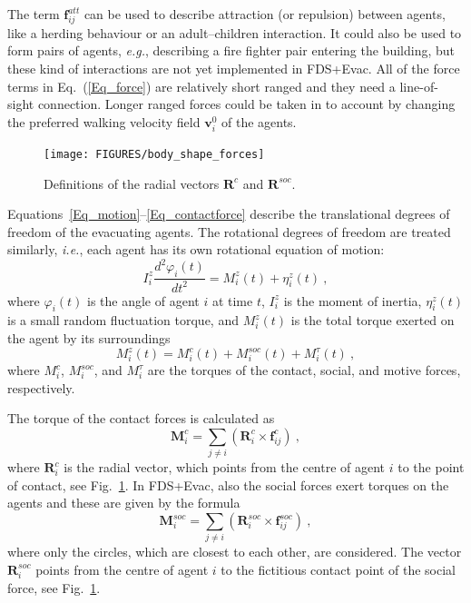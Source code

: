 \documentclass[12pt,a4paper,final,twoside]{stylevk}
\begin{document}
The term $\mathbf{f}_{ij}^{att}$ can be used to describe attraction
(or repulsion) between agents, like a herding behaviour or an
adult--children interaction.  It could also be used to form pairs of
agents, \emph{e.g.}, describing a fire fighter pair entering the
building, but these kind of interactions are not yet implemented in
FDS+Evac.  All of the force terms in Eq.~(\ref{Eq_force}) are
relatively short ranged and they need a line-of-sight connection.
Longer ranged forces could be taken in to account by changing the
preferred walking velocity field $ \mathbf{v}_i^0 $ of the agents.

%
\begin{figure}[!bt]
  \centerline{\texttt{[image: FIGURES/body\_shape\_forces]} }
\caption{Definitions of the radial vectors $\mathbf{R}^c$ and
  $\mathbf{R}^{soc}$. }\label{Fig_BodySize} 
\end{figure}
%

Equations~\ref{Eq_motion}--\ref{Eq_contactforce} describe the
translational degrees of freedom of the evacuating agents.  The
rotational degrees of freedom are treated similarly, \emph{i.e.}, each
agent has its own rotational equation of motion:
%
\begin{equation}\label{Eq_rotmotion}
   I^z_{i} \frac{d^2 \varphi_i (t)}{dt^2} = {M}^z_{i} (t)  +
  {\eta}^z_{i} (t) ~,  
\end{equation}
%
where $\varphi_i(t)$ is the angle of agent $i$ at time $t$,
$I^z_{i}$ is the moment of inertia, ${\eta}^z_{i} (t)$ is a small
random fluctuation torque, and ${M}^z_{i} (t)$ is the total torque
exerted on the agent by its surroundings
%
\begin{equation}\label{Eq_total_torque}
  {M}^z_{i} (t) =  {M}^c_{i} (t) + {M}^{soc}_{i} (t) +  {M}^{\tau}_{i}
  (t) ~,
\end{equation}
%
where ${M}^c_{i}$, ${M}^{soc}_{i}$, and ${M}^{\tau}_{i}$ are the
torques of the contact, social, and motive forces, respectively.


The torque of the contact forces is calculated as
%
\begin{equation}\label{Eq_fc_torque}
  \mathbf{M}^c_{i} = \sum_{j \ne i} \left( \mathbf{R}^c_{i} \times
  \mathbf{f}_{ij}^{c} \right) ~, 
\end{equation}
%
where $\mathbf{R}^c_{i}$ is the radial vector, which points from the
centre of agent $i$ to the point of contact, see
Fig.~\ref{Fig_BodySize}.  In FDS+Evac, also the social forces exert
torques on the agents and these are given by the formula
%
\begin{equation}\label{Eq_soc_torque}
  \mathbf{M}^{soc}_{i} =  \sum_{j \ne i} \left( \mathbf{R}^{soc}_{i}
  \times \mathbf{f}_{ij}^{soc} \right) ~,
\end{equation}
%
where only the circles, which are closest to each other, are
considered.  The vector $\mathbf{R}^{soc}_{i}$ points from the centre
of agent $i$ to the fictitious contact point of the social force, see
Fig.~\ref{Fig_BodySize}.
\end{document}
